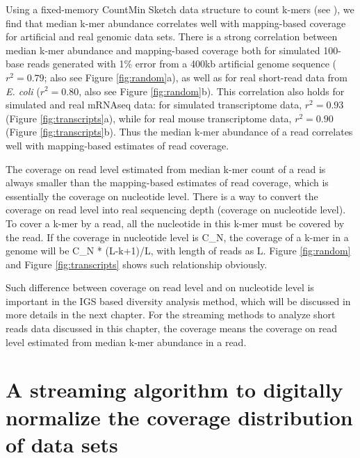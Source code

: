Using a fixed-memory CountMin Sketch data structure to count k-mers (see
 \cite{countminsketch}), we find that median k-mer abundance
correlates well with mapping-based coverage for artificial and real genomic
data sets.  There is a strong correlation between median k-mer abundance and
mapping-based coverage both for simulated 100-base reads generated with 1\%
error from a 400kb artificial genome sequence ($r^2 = 0.79$; also see Figure
\ref{fig:random}a), as well as for real short-read data from {\em E. coli}
($r^2 = 0.80$, also see Figure \ref{fig:random}b).  This correlation also holds
for simulated and real mRNAseq data: for simulated transcriptome data, $r^2 =
0.93$ (Figure \ref{fig:transcripts}a), while for real mouse transcriptome data,
$r^2 = 0.90$ (Figure \ref{fig:transcripts}b). Thus the median k-mer abundance
of a read correlates well with mapping-based estimates of read coverage.

The coverage on read level estimated from median k-mer count of a read is
always smaller than the mapping-based estimates of read coverage, which is
essentially the coverage on nucleotide level. There is a way to convert the
coverage on read level into real sequencing depth (coverage on nucleotide
level). To cover a k-mer by a read, all the nucleotide in this k-mer must be
covered by the read. If the coverage in nucleotide level is C\_N, the coverage
of a k-mer in a genome will be C\_N * (L-k+1)/L, with length of reads as L.
\cite{Kelley2010} Figure \ref{fig:random} and Figure \ref{fig:transcripts}
shows such relationship obviously.

Such difference between coverage on read level and on nucleotide level is
important in the IGS based diversity analysis method, which will be discussed
in more details in the next chapter. For the streaming methods to analyze short
reads data discussed in this chapter, the coverage means the coverage on read
level estimated from median k-mer abundance in a read.



\section{A streaming algorithm to digitally normalize the coverage distribution
of data sets}

